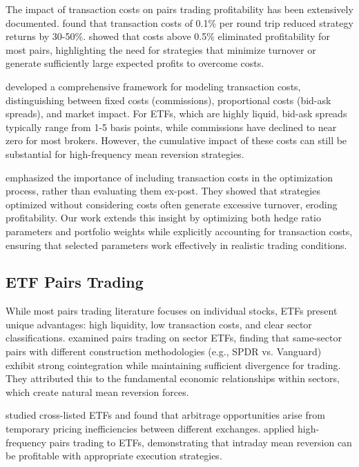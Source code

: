 \documentclass[12pt]{article}
\begin{document}
The impact of transaction costs on pairs trading profitability has been extensively documented. \citet{perlin2009evaluation} found that transaction costs of 0.1\% per round trip reduced strategy returns by 30-50\%. \citet{do2006pairs} showed that costs above 0.5\% eliminated profitability for most pairs, highlighting the need for strategies that minimize turnover or generate sufficiently large expected profits to overcome costs.

\citet{lesmond2004costs} developed a comprehensive framework for modeling transaction costs, distinguishing between fixed costs (commissions), proportional costs (bid-ask spreads), and market impact. For ETFs, which are highly liquid, bid-ask spreads typically range from 1-5 basis points, while commissions have declined to near zero for most brokers. However, the cumulative impact of these costs can still be substantial for high-frequency mean reversion strategies.

\citet{avellaneda2010statistical} emphasized the importance of including transaction costs in the optimization process, rather than evaluating them ex-post. They showed that strategies optimized without considering costs often generate excessive turnover, eroding profitability. Our work extends this insight by optimizing both hedge ratio parameters and portfolio weights while explicitly accounting for transaction costs, ensuring that selected parameters work effectively in realistic trading conditions.

\subsection{ETF Pairs Trading}

While most pairs trading literature focuses on individual stocks, ETFs present unique advantages: high liquidity, low transaction costs, and clear sector classifications. \citet{chen2012pairs} examined pairs trading on sector ETFs, finding that same-sector pairs with different construction methodologies (e.g., SPDR vs. Vanguard) exhibit strong cointegration while maintaining sufficient divergence for trading. They attributed this to the fundamental economic relationships within sectors, which create natural mean reversion forces.

\citet{rad2016pairs} studied cross-listed ETFs and found that arbitrage opportunities arise from temporary pricing inefficiencies between different exchanges. \citet{avellaneda2010statistical} applied high-frequency pairs trading to ETFs, demonstrating that intraday mean reversion can be profitable with appropriate execution strategies.
\end{document}
